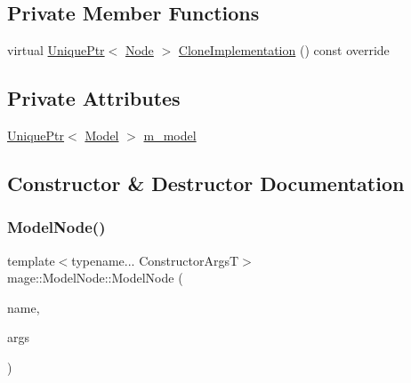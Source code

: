\subsection*{Private Member Functions}
\begin{DoxyCompactItemize}
\item 
virtual \hyperlink{namespacemage_a8c307fbcc33bce9b7f2aa4c26c3b95cf}{Unique\+Ptr}$<$ \hyperlink{classmage_1_1_node}{Node} $>$ \hyperlink{classmage_1_1_model_node_a34146201083015276b38240af307417f}{Clone\+Implementation} () const override
\end{DoxyCompactItemize}
\subsection*{Private Attributes}
\begin{DoxyCompactItemize}
\item 
\hyperlink{namespacemage_a8c307fbcc33bce9b7f2aa4c26c3b95cf}{Unique\+Ptr}$<$ \hyperlink{classmage_1_1_model}{Model} $>$ \hyperlink{classmage_1_1_model_node_a784faf19f736a1c74808321ed0e52d36}{m\+\_\+model}
\end{DoxyCompactItemize}


\subsection{Constructor \& Destructor Documentation}
\hypertarget{classmage_1_1_model_node_ab8d77a4792224d8909fb399393b8294f}{}\label{classmage_1_1_model_node_ab8d77a4792224d8909fb399393b8294f} 
\subsubsection{\texorpdfstring{Model\+Node()}{ModelNode()}\hspace{0.1cm}{\footnotesize\ttfamily [1/4]}}
{\footnotesize\ttfamily template$<$typename... Constructor\+ArgsT$>$ \\
mage\+::\+Model\+Node\+::\+Model\+Node (\begin{DoxyParamCaption}\item[{const string \&}]{name,  }\item[{Constructor\+ArgsT \&\&...}]{args }\end{DoxyParamCaption})\hspace{0.3cm}{\ttfamily [explicit]}}


